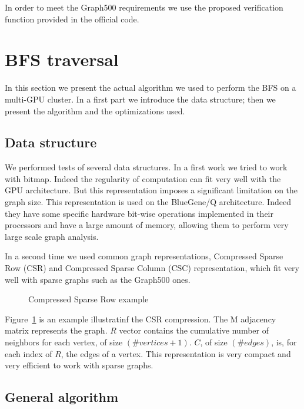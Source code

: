In order to meet the Graph500 requirements we use the proposed verification function provided in the official code.

\section{BFS traversal}
In this section we present the actual algorithm we used to perform the BFS on a multi-GPU cluster. 
In a first part we introduce the data structure; then we present the algorithm and the optimizations used.

\subsection{Data structure}
We performed tests of several data structures.
In a first work we tried to work with bitmap. Indeed the regularity of computation can fit very well with the GPU architecture. But this representation imposes a significant limitation on the graph size. 
This representation is used on the BlueGene/Q architecture. 
Indeed they have some specific hardware bit-wise operations implemented in their processors and have a large amount of memory, allowing them to perform very large scale graph analysis. 

In a second time we used common graph representations, Compressed Sparse Row (CSR) and Compressed Sparse Column (CSC) representation, which fit very well with sparse graphs such as the Graph500 ones.

\begin{figure}[t!]
\begin{center}

\end{center}
\caption{Compressed Sparse Row example}
\label{fig:csr_representation}
\end{figure}

Figure~\ref{fig:csr_representation} is an example illustratinf the CSR compression.
The M adjacency matrix represents the graph. $R$ vector contains the cumulative number of neighbors for each vertex, of size $(\#vertices +1)$. $C$, of size $(\#edges)$, is, for each index of $R$, the edges of a vertex.
This representation is very compact and very efficient to work with sparse graphs. 

\subsection{General algorithm}

